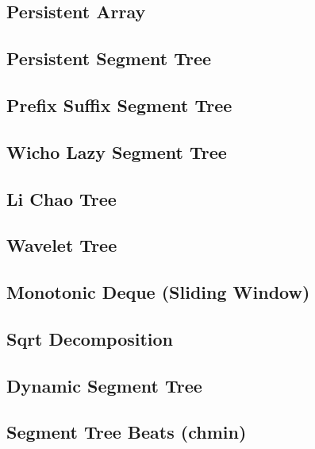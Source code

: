 \documentclass[10pt,letterpaper,landscape,twocolumn]{article}
\begin{document}
\subsection{Persistent Array}

\subsection{Persistent Segment Tree}

\subsection{Prefix Suffix Segment Tree}

\subsection{Wicho Lazy Segment Tree}

\subsection{Li Chao Tree}

\subsection{Wavelet Tree}

\subsection{Monotonic Deque (Sliding Window)}

\subsection{Sqrt Decomposition}

\subsection{Dynamic Segment Tree}

\subsection{Segment Tree Beats (chmin)}

\end{document}
